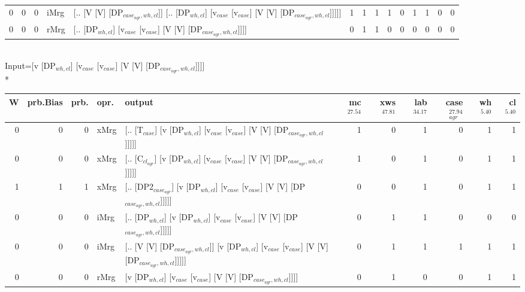 \begin{tabularx}{\linewidth}{rrrlXrrrrrrrrr}
   0 &       0 &   0 & iMrg & [.. [V [V] [DP$_{case_{agr},wh,cl}$]] [.. [DP$_{wh,cl}$] [v$_{case}$ [v$_{case}$] [V [V] [DP$_{case_{agr},wh,cl}$]]]]]                   &            1 &             1 &             1 &                  1 &              0 &           1 &           1 &                0 &             0 \\
   0 &       0 &   0 & rMrg & [.. [DP$_{wh,cl}$] [v$_{case}$ [v$_{case}$] [V [V] [DP$_{case_{agr},wh,cl}$]]]]                                                    &            0 &             1 &             1 &                  0 &              0 &           0 &           0 &                0 &             0 \\
\hline
\end{tabularx}\endgroup\\
\begingroup\scriptsize Input=[v [DP$_{wh,cl}$] [v$_{case}$ [v$_{case}$] [V [V] [DP$_{case_{agr},wh,cl}$]]]]\\*
\begin{tabularx}{\linewidth}{rrrlXrrrrrr}
\hline
   W &   prb.Bias &   prb. & opr.   & output                                                                                        &   mc$^{27.54}$ &   xws$^{47.81}$ &   lab$^{34.17}$ &   case$_{agr}^{27.94}$ &   wh$^{5.40}$ &   cl$^{5.40}$ \\
\hline
   0 &       0 &   0 & xMrg & [.. [T$_{case}$] [v [DP$_{wh,cl}$] [v$_{case}$ [v$_{case}$] [V [V] [DP$_{case_{agr},wh,cl}$]]]]]                    &            1 &             0 &             1 &                  0 &           1 &           1 \\
   0 &       0 &   0 & xMrg & [.. [C$_{cl_{agr}}$] [v [DP$_{wh,cl}$] [v$_{case}$ [v$_{case}$] [V [V] [DP$_{case_{agr},wh,cl}$]]]]]                  &            1 &             0 &             1 &                  0 &           1 &           1 \\
   1 &       1 &   1 & xMrg & [.. [DP2$_{case_{agr}}$] [v [DP$_{wh,cl}$] [v$_{case}$ [v$_{case}$] [V [V] [DP$_{case_{agr},wh,cl}$]]]]]              &            0 &             0 &             1 &                  0 &           1 &           1 \\
   0 &       0 &   0 & iMrg & [.. [DP$_{wh,cl}$] [v [DP$_{wh,cl}$] [v$_{case}$ [v$_{case}$] [V [V] [DP$_{case_{agr},wh,cl}$]]]]]                  &            0 &             1 &             1 &                  0 &           0 &           0 \\
   0 &       0 &   0 & iMrg & [.. [V [V] [DP$_{case_{agr},wh,cl}$]] [v [DP$_{wh,cl}$] [v$_{case}$ [v$_{case}$] [V [V] [DP$_{case_{agr},wh,cl}$]]]]] &            0 &             1 &             1 &                  1 &           1 &           1 \\
   0 &       0 &   0 & rMrg & [v [DP$_{wh,cl}$] [v$_{case}$ [v$_{case}$] [V [V] [DP$_{case_{agr},wh,cl}$]]]]                                  &            0 &             1 &             0 &                  0 &           1 &           1 \\
\hline
\end{tabularx}\endgroup\\
